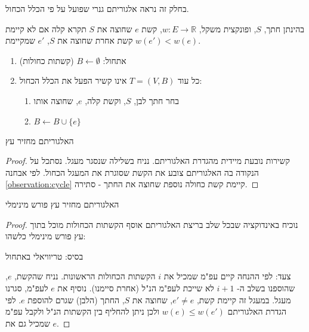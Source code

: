 בחלק זה נראה אלגוריתם גנרי שפועל על פי הכלל הכחול.

\begin{definition}
בהינתן חתך, $S$, ופונקצית משקל, 
$w: E \to \mathbb{R}$,
קשת $e$ שחוצה את $S$ תקרא קלה אם לא קיימת קשת אחרת שחוצה את $S$, 
$e'$
שמקיימת 
$w(e') < w(e)$.
\end{definition}
\begin{enumerate}
\item
אתחול:
$B \leftarrow \emptyset$ 
(קשתות כחולות)
\item
כל עוד 
$T = (V, B)$
אינו קשיר הפעל את הכלל הכחול:
\begin{enumerate}
\item
בחר חתך לבן, $S$, וקשת קלה, $e$, שחוצה אותו 
\item
$B \leftarrow B \cup \{e\}$
\end{enumerate}
\end{enumerate}

\begin{claim}
האלגוריתם מחזיר עץ
\end{claim}
\begin{proof}
קשירות נובעת מיידית מהגדרת האלגוריתם.
נניח בשלילה שנסגר מעגל.
נסתכל על הנקודה בה האלגוריתם צובע את הקשת שסוגרת את המעגל הכחול.
לפי אבחנה 
\ref{observation:cycle}
קיימת קשת כחולה נוספת שחוצה את החתך - סתירה.
\end{proof}

\begin{claim}
\label{claim:blue}
האלגוריתם מחזיר עץ פורש מינימלי
\end{claim}

\begin{proof}
נוכיח באינדוקציה שבכל שלב בריצת האלגוריתם אוסף הקשתות הכחולות מוכל בתוך עץ פורש מינימלי כלשהו:

בסיס: טריוויאלי באתחול

צעד: לפי ההנחה קיים עפ"מ שמכיל את $i$ הקשתות הכחולות הראשונות.
נניח שהקשת, $e$, שהוספנו בשלב ה-%
$i+1$
לא שייכת לעפ"מ הנ"ל (אחרת סיימנו).
נוסיף את $e$ לעפ"מ, סגרנו מעגל.
במעגל זה קיימת קשת,
$e' \neq e$,
שחוצה את $S$, החתך (הלבן) שגרם להוספת $e$.
לפי הגדרת האלגוריתם
$w(e) \leq w(e')$
ולכן ניתן להחליף בין הקשתות הנ"ל ולקבל עפ"מ שמכיל גם את $e$.
\end{proof}


